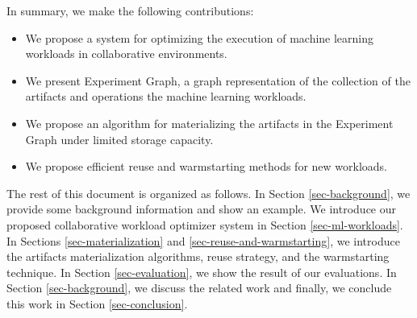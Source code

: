 In summary, we make the following contributions:
\begin{itemize}
\item We propose a system for optimizing the execution of machine learning workloads in collaborative environments.
\item We present Experiment Graph, a graph representation of the collection of the artifacts and operations the machine learning workloads.
\item We propose an algorithm for materializing the artifacts in the Experiment Graph under limited storage capacity.
\item We propose efficient reuse and warmstarting methods for new workloads.
\end{itemize}

The rest of this document is organized as follows.
In Section \ref{sec-background}, we provide some background information and show an example.
We introduce our proposed collaborative workload optimizer system in Section \ref{sec-ml-workloads}.
In Sections \ref{sec-materialization} and \ref{sec-reuse-and-warmstarting}, we introduce the artifacts materialization algorithms, reuse strategy, and the warmstarting technique. 
In Section \ref{sec-evaluation}, we show the result of our evaluations.
In Section \ref{sec-background}, we discuss the related work and finally, we conclude this work in Section \ref{sec-conclusion}.